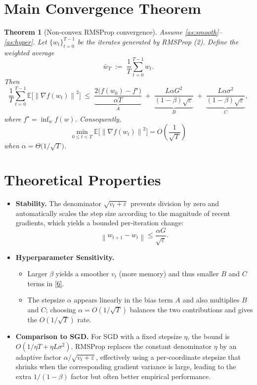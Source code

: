 \documentclass{article}
\newcommand{\EE}{\mathbb{E}}
\newcommand{\norm}[1]{\left\lVert#1\right\rVert}
\newtheorem{theorem}{Theorem}
\begin{document}
\section*{Main Convergence Theorem}
\begin{theorem}[Non‑convex RMSProp convergence]\label{thm:main}
Assume \ref{as:smooth}–\ref{as:hyper}. Let $\{w_{t}\}_{t=0}^{T-1}$ be the iterates generated by RMSProp (2). Define the weighted average
\[
\bar w_{T}\;:=\;\frac{1}{T}\sum_{t=0}^{T-1}w_{t}.
\]
Then
\[
\frac{1}{T}\sum_{t=0}^{T-1}\EE\bigl[\norm{\nabla f(w_{t})}^{2}\bigr]
\;\le\;
\underbrace{\frac{2\bigl(f(w_{0})-f^{\star}\bigr)}{\alpha T}}_{A}
\;+\;
\underbrace{\frac{L\alpha G^{2}}{(1-\beta)\sqrt{\varepsilon}}}_{B}
\;+\;
\underbrace{\frac{L\alpha\sigma^{2}}{(1-\beta)\sqrt{\varepsilon}}}_{C},
\tag{6}
\]
where $f^{\star}=\inf_{w}f(w)$. Consequently,
\[
\min_{0\le t<T}\EE\bigl[\norm{\nabla f(w_{t})}^{2}\bigr]=O\!\left(\frac{1}{\sqrt{T}}\right)
\]
when $\alpha=\Theta\bigl(1/\sqrt{T}\bigr)$.
\end{theorem}

\section*{Theoretical Properties}
\begin{itemize}[leftmargin=*]
\item \textbf{Stability.} The denominator $\sqrt{v_{t}+\varepsilon}$ prevents division by zero and automatically scales the step size according to the magnitude of recent gradients, which yields a bounded per‑iteration change:
\[
\norm{w_{t+1}-w_{t}}\le\frac{\alpha G}{\sqrt{\varepsilon}}.
\]
\item \textbf{Hyperparameter Sensitivity.}
\begin{itemize}
\item Larger $\beta$ yields a smoother $v_{t}$ (more memory) and thus smaller $B$ and $C$ terms in \eqref{6}.
\item The stepsize $\alpha$ appears linearly in the bias term $A$ and also multiplies $B$ and $C$; choosing $\alpha=O(1/\sqrt{T})$ balances the two contributions and gives the $O(1/\sqrt{T})$ rate.
\end{itemize}
\item \textbf{Comparison to SGD.} For SGD with a fixed stepsize $\eta$, the bound is $O(1/\eta T + \eta L\sigma^{2})$. RMSProp replaces the constant denominator $\eta$ by an adaptive factor $\alpha/\sqrt{v_{t}+\varepsilon}$, effectively using a per‑coordinate stepsize that shrinks when the corresponding gradient variance is large, leading to the extra $1/(1-\beta)$ factor but often better empirical performance.
\end{itemize}
\end{document}
